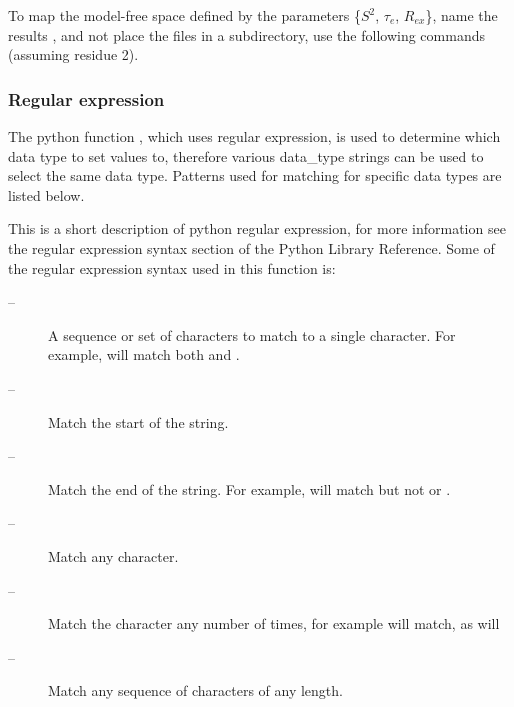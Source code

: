 




To map the model-free space  defined by the parameters \{$S^2$, $\tau_e$, $R_{ex}$\}, name the results , and not place the files in a subdirectory, use the following commands (assuming residue 2).





\subsubsection{Regular expression}

The python function , which uses regular expression, is used to determine which data type to set values to, therefore various data\_type strings can be used to select the same data type.  Patterns used for matching for specific data types are listed below.


This is a short description of python regular expression, for more information see the regular expression syntax section of the Python Library Reference.  Some of the regular expression syntax used in this function is:


\begin{description}
\item[\quotecmd{[]} --]  A sequence or set of characters to match to a single character.  For example,  will match both  and . 
\item[\quotecmd{\^{}} --]  Match the start of the string. 
\item[\quotecmd{\$} --]  Match the end of the string.  For example,  will match  but not  or . 
\item[ --]  Match any character. 
\item[ --]  Match the character  any number of times, for example  will match, as will  
\item[ --]  Match any sequence of characters of any length. 
\end{description}



